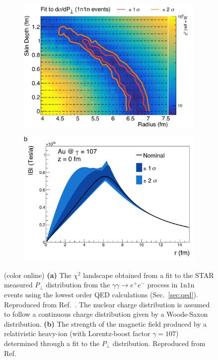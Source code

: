 \documentclass[12pt,epjc3]{svjour3}\sloppy
\begin{document}
\begin{figure}
  \centering
  \begin{subfigure}{.49\textwidth}
    \centering
    \includegraphics[width=0.99\textwidth]{fig/Fig_contour.pdf}
    \caption{}
  \end{subfigure}%
  \begin{subfigure}{.51\textwidth}
    \centering
    \includegraphics[width=.99\linewidth]{fig/bfield_au_smooth.pdf}
    \caption{}
  \end{subfigure}
  \caption{(color online) \textbf{(a)} The $\chi^2$ landscape obtained from a fit to the STAR measured $P_\perp$ distribution from the $\gamma\gamma \rightarrow e^+e^-$ process in $1$n$1$n events using the lowest order QED calculations (Sec.~\ref{sec:qed}). Reproduced from Ref.~\cite{starcollaborationMeasurementMomentumAngular2021}. The nuclear charge distribution is assumed to follow a continuous charge distribution given by a Woods-Saxon distribution. \textbf{(b)} The strength of the magnetic field produced by a relativistic heavy-ion (with Lorentz-boost factor $\gamma=107$) determined through a fit to the $P_\perp$ distribution. Reproduced from Ref.~\cite{starcollaborationMeasurementMomentumAngular2021} }
  \label{fig:b_mapping}
\end{figure}
\end{document}
